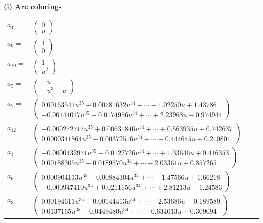 \documentclass[1p]{elsarticle_modified}
\theoremstyle{definition}
\begin{document}
\flushleft \textbf{(i) Arc colorings}\\
\begin{tabular}{m{7pt} m{180pt} m{7pt} m{180pt} }
\flushright $a_{4}=$&$\begin{pmatrix}0\\u\end{pmatrix}$ \\
\flushright $a_{9}=$&$\begin{pmatrix}1\\0\end{pmatrix}$ \\
\flushright $a_{10}=$&$\begin{pmatrix}1\\u^2\end{pmatrix}$ \\
\flushright $a_{5}=$&$\begin{pmatrix}- u\\- u^3+u\end{pmatrix}$ \\
\flushright $a_{7}=$&$\begin{pmatrix}0.00163541 u^{35}-0.00781632 u^{34}+\cdots-1.02250 u+1.43786\\-0.00144017 u^{35}+0.0174956 u^{34}+\cdots+2.23968 u-0.974944\end{pmatrix}$ \\
\flushright $a_{12}=$&$\begin{pmatrix}-0.000272717 u^{35}+0.00631846 u^{34}+\cdots+0.563935 u+0.742637\\0.0000341864 u^{35}-0.00372516 u^{34}+\cdots-0.444645 u+0.210801\end{pmatrix}$ \\
\flushright $a_{1}=$&$\begin{pmatrix}-0.0000432971 u^{35}+0.0122726 u^{34}+\cdots+1.33646 u+0.416353\\0.00188305 u^{35}-0.0189570 u^{34}+\cdots-2.03361 u+0.857265\end{pmatrix}$ \\
\flushright $a_{6}=$&$\begin{pmatrix}0.000904113 u^{35}-0.00884304 u^{34}+\cdots-1.47566 u+1.66218\\-0.000947410 u^{35}+0.0211156 u^{34}+\cdots+2.81213 u-1.24583\end{pmatrix}$ \\
\flushright $a_{3}=$&$\begin{pmatrix}0.00194611 u^{35}-0.00144413 u^{34}+\cdots+2.53686 u-0.189589\\0.0137165 u^{35}-0.0449480 u^{34}+\cdots-0.634013 u+0.309094\end{pmatrix}$ \\

\end{tabular}
\end{document}
